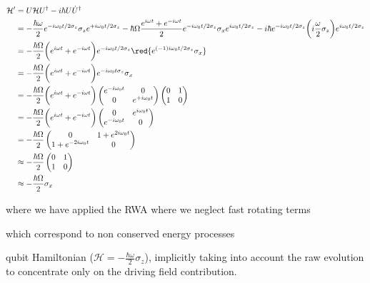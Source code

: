   \begin{equation}\label{app2New}
    \begin{aligned}
      \mathcal{H'} & = U\mathcal{H}U^{\dagger} - i\hbar U\dot{U}^{\dagger}\\
      & = -\frac{\hbar\omega}{2}e^{-i\omega_0t/2\sigma_z}\sigma_ze^{+i\omega_0t/2\sigma_z}-\hbar\Omega\frac{e^{i\omega t}+e^{-i\omega t}}{2}e^{-i\omega_0t/2\sigma_z}\sigma_xe^{i\omega_0t/2\sigma_z}- i\hbar e^{-i\omega_0t/2\sigma_z}\bigg(i\frac{\omega}{2}\sigma_z\bigg)e^{i\omega_0t/2\sigma_z}\\
      & = -\frac{\hbar\Omega}{2}\bigg(e^{i\omega t}+e^{-i\omega t}\bigg)e^{-i\omega_0t/2\sigma_z}\red{e^{(-1)i\omega_0t/2\sigma_z}\sigma_x}\\
      & = -\frac{\hbar\Omega}{2}\bigg(e^{i\omega t}+e^{-i\omega t}\bigg){e^{-i\omega_0t\sigma_z}\sigma_x}\\
      &            =-\frac{\hbar\Omega}{2}\bigg(e^{i\omega             t}+e^{-i\omega            t}\bigg)\begin{pmatrix}
        e^{-i\omega_0t}&0\\0&e^{+i\omega_0t}
      \end{pmatrix}\begin{pmatrix}
        0&1\\1&0
      \end{pmatrix}\\
      &            =-\frac{\hbar\Omega}{2}\bigg(e^{i\omega             t}+e^{-i\omega            t}\bigg)\begin{pmatrix}
        0&e^{i\omega_0t}\\e^{-i\omega_0t}&0
      \end{pmatrix}
      \\
      & =-\frac{\hbar\Omega}{2}\begin{pmatrix} 0&1+e^{2i\omega_0t}\\1+e^{-2i\omega_0t}&0
      \end{pmatrix}
      \\
      & \approx -\frac{\hbar\Omega}{2}\begin{pmatrix} 0&1\\1&0
      \end{pmatrix}
      \\
      & \approx -\frac{\hbar\Omega}{2}\sigma_x
    \end{aligned}
  \end{equation}

  \noindent where we have applied the RWA where  we neglect fast rotating terms \begin{framed}\noindent which correspond
    to non conserved energy processes
  \end{framed} qubit Hamiltonian ($ \mathcal{H} =  -\frac{\hbar\omega}{2}\sigma_z $), implicitly taking into account the
  raw evolution to concentrate only on the driving field contribution.

